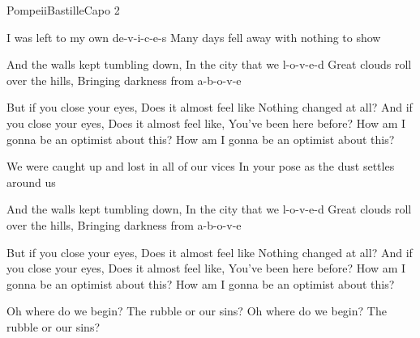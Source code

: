 \begin{song}{Pompeii}{Bastille}{Capo 2}


I was left to my own de-v-i-c-e-s
Many days fell away with nothing to show

And the walls kept tumbling down, In the city that we l-o-v-e-d
Great clouds roll over the hills, Bringing darkness from a-b-o-v-e

But if you close your eyes, Does it almost feel like
Nothing changed at all? And if you close your eyes,
Does it almost feel like, You've been here before?
How am I gonna be an optimist about this?
How am I gonna be an optimist about this?

We were caught up and lost in all of our vices
In your pose as the dust settles around us

And the walls kept tumbling down, In the city that we l-o-v-e-d
Great clouds roll over the hills, Bringing darkness from a-b-o-v-e

But if you close your eyes, Does it almost feel like
Nothing changed at all? And if you close your eyes,
Does it almost feel like, You've been here before?
How am I gonna be an optimist about this?
How am I gonna be an optimist about this?


Oh where do we begin? The rubble or our sins?
Oh where do we begin? The rubble or our sins?


\end{song}
